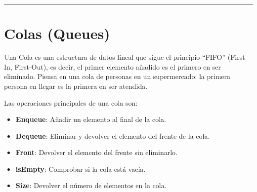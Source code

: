 \documentclass[
  spanish,
  letterpaper,
  DIV=11,
  numbers=noendperiod]{scrreprt}
\newenvironment{Shaded}{\begin{snugshade}}{\end{snugshade}}
\newcommand{\CommentTok}[1]{\textcolor[rgb]{0.37,0.37,0.37}{#1}}
\newcommand{\ControlFlowTok}[1]{\textcolor[rgb]{0.00,0.23,0.31}{\textbf{#1}}}
\newcommand{\FunctionTok}[1]{\textcolor[rgb]{0.28,0.35,0.67}{#1}}
\newcommand{\NormalTok}[1]{\textcolor[rgb]{0.00,0.23,0.31}{#1}}
\newcommand{\OtherTok}[1]{\textcolor[rgb]{0.00,0.23,0.31}{#1}}
\newcommand{\SpecialCharTok}[1]{\textcolor[rgb]{0.37,0.37,0.37}{#1}}
\newcommand{\StringTok}[1]{\textcolor[rgb]{0.13,0.47,0.30}{#1}}
\providecommand{\tightlist}{%
  \setlength{\itemsep}{0pt}\setlength{\parskip}{0pt}}
\begin{document}
\begin{Shaded}
\end{Shaded}

\begin{center}\rule{0.5\linewidth}{0.5pt}\end{center}


\chapter{Colas (Queues)}\label{colas-queues}

Una Cola es una estructura de datos lineal que sigue el principio
``FIFO'' (First-In, First-Out), es decir, el primer elemento añadido es
el primero en ser eliminado. Piensa en una cola de personas en un
supermercado: la primera persona en llegar es la primera en ser
atendida.

Las operaciones principales de una cola son:

\begin{itemize}
\tightlist
\item
  \textbf{Enqueue}: Añadir un elemento al final de la cola.
\item
  \textbf{Dequeue}: Eliminar y devolver el elemento del frente de la
  cola.
\item
  \textbf{Front}: Devolver el elemento del frente sin eliminarlo.
\item
  \textbf{isEmpty}: Comprobar si la cola está vacía.
\item
  \textbf{Size}: Devolver el número de elementos en la cola.
\end{itemize}
\end{document}
